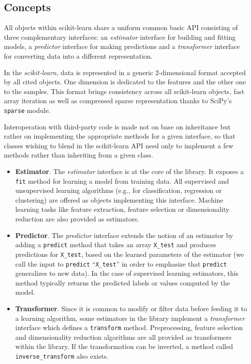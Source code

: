 \documentclass{frontiersSCNS} %
\begin{document}
\subsection{Concepts}

All objects within scikit-learn share a uniform common basic API consisting of three
complementary interfaces: an \textit{estimator} interface for building and
fitting models, a \textit{predictor} interface for making predictions and a
\textit{transformer} interface for converting data into a different representation.

In the {\em scikit-learn}, data is represented in a generic 2-dimensional format
accepted by all cited objects. One dimension is dedicated to the features and
the other one to the samples. This format brings
consistency across all scikit-learn objects, fast array iteration
as well as compressed sparse representation thanks to SciPy's \texttt{sparse} module.

Interoperation with third-party code is made not on base on inheritance but
rather on implementing the appropriate methods for a given interface, so that
classes wishing to blend in the scikit-learn API need only to implement a few
methods rather than inheriting from a given class.

\begin{itemize}
\item {\bf Estimator}. The \textit{estimator} interface is at the core of the library. It exposes a
    \texttt{fit} method for learning a model from training data.  All supervised
    and unsupervised learning algorithms (e.g., for classification, regression or
    clustering) are offered as objects implementing this interface. Machine
    learning tasks like feature extraction, feature selection or dimensionality
    reduction are also provided as estimators.

\item {\bf Predictor}. The \textit{predictor} interface extends the notion of an estimator
    by adding a \texttt{predict}
    method that takes an array \texttt{X\_test} and produces
    predictions for \texttt{X\_test}, based on the learned parameters of the
    estimator (we call the input to \texttt{predict} ``\texttt{X\_test}'' in order
    to emphasize that \texttt{predict} generalizes to new data). In the case of
    supervised learning estimators, this method typically returns the predicted
    labels or values computed by the model.

\item {\bf Transformer}. Since it is common to modify or filter data before feeding it to a learning
    algorithm, some estimators in the library implement a \textit{transformer}
    interface which defines a \texttt{transform} method. Preprocessing, feature selection and
    dimensionality reduction
    algorithms are all provided as transformers within the library. If the transformation
    can be inverted, a method called \verb!inverse_transform! also exists.

\end{itemize}
\end{document}

